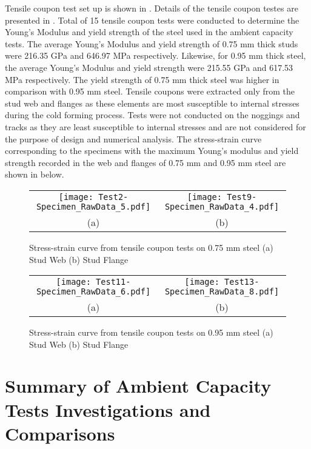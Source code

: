 Tensile coupon test set up is shown in . Details of the tensile coupon testes are presented in . Total of 15 tensile coupon tests were conducted to determine the Young's Modulus and yield strength of the steel used in the ambient capacity tests. The average Young's Modulus and yield strength of 0.75 mm thick studs were 216.35 GPa and 646.97 MPa respectively. Likewise, for 0.95 mm thick steel, the average Young's Modulus and yield strength were 215.55 GPa and 617.53 MPa respectively. The yield strength of 0.75 mm thick steel was higher in comparison with 0.95 mm steel. Tensile coupons were extracted only from the stud web and flanges as these elements are most susceptible to internal stresses during the cold forming process. Tests were not conducted on the noggings and tracks as they are least susceptible to internal stresses and are not considered for the purpose of design and numerical analysis. The stress-strain curve corresponding to the specimens with the maximum Young's modulus and yield strength recorded in the web and flanges of 0.75 mm and 0.95 mm steel are shown in  below.
\begin{figure}
	\centering
		\begin{tabular}{cc}
			\texttt{[image: Test2-Specimen\_RawData\_5.pdf]} & \texttt{[image: Test9-Specimen\_RawData\_4.pdf]} \\ 
			(a) & (b)  \\ 
		\end{tabular} 
		\caption{Stress-strain curve from tensile coupon tests on 0.75 mm steel (a) Stud Web (b) Stud Flange}
		\label{fig:075-stress-strain}
\end{figure}
\begin{figure}
	\centering
		\begin{tabular}{cc}
			\texttt{[image: Test11-Specimen\_RawData\_6.pdf]} & \texttt{[image: Test13-Specimen\_RawData\_8.pdf]} \\ 
			(a) & (b)  \\ 
		\end{tabular} 
		\caption{Stress-strain curve from tensile coupon tests on 0.95 mm steel (a) Stud Web (b) Stud Flange}
		\label{fig:095-stress-strain}
\end{figure}

\section{Summary of Ambient Capacity Tests Investigations and Comparisons}


